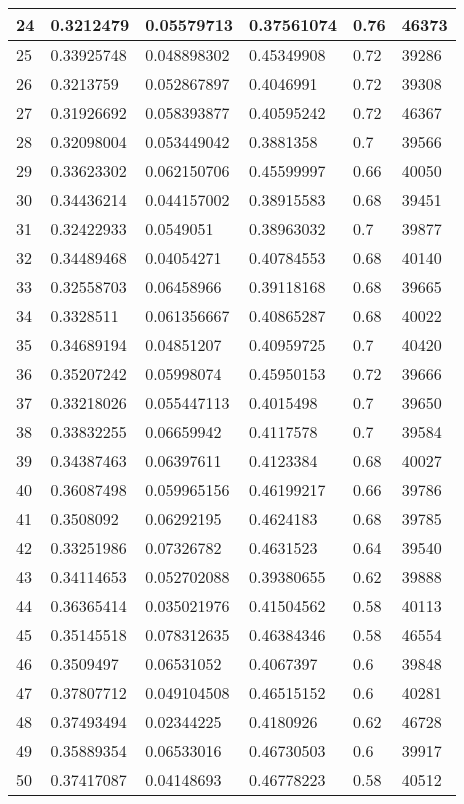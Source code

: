 \begin{longtable}{|l|l|l|l|l|l|}
24 & 0.3212479 & 0.05579713 & 0.37561074 & 0.76 & 46373 \\ \hline 
25 & 0.33925748 & 0.048898302 & 0.45349908 & 0.72 & 39286 \\ \hline 
26 & 0.3213759 & 0.052867897 & 0.4046991 & 0.72 & 39308 \\ \hline 
27 & 0.31926692 & 0.058393877 & 0.40595242 & 0.72 & 46367 \\ \hline 
28 & 0.32098004 & 0.053449042 & 0.3881358 & 0.7 & 39566 \\ \hline 
29 & 0.33623302 & 0.062150706 & 0.45599997 & 0.66 & 40050 \\ \hline 
30 & 0.34436214 & 0.044157002 & 0.38915583 & 0.68 & 39451 \\ \hline 
31 & 0.32422933 & 0.0549051 & 0.38963032 & 0.7 & 39877 \\ \hline 
32 & 0.34489468 & 0.04054271 & 0.40784553 & 0.68 & 40140 \\ \hline 
33 & 0.32558703 & 0.06458966 & 0.39118168 & 0.68 & 39665 \\ \hline 
34 & 0.3328511 & 0.061356667 & 0.40865287 & 0.68 & 40022 \\ \hline 
35 & 0.34689194 & 0.04851207 & 0.40959725 & 0.7 & 40420 \\ \hline 
36 & 0.35207242 & 0.05998074 & 0.45950153 & 0.72 & 39666 \\ \hline 
37 & 0.33218026 & 0.055447113 & 0.4015498 & 0.7 & 39650 \\ \hline 
38 & 0.33832255 & 0.06659942 & 0.4117578 & 0.7 & 39584 \\ \hline 
39 & 0.34387463 & 0.06397611 & 0.4123384 & 0.68 & 40027 \\ \hline 
40 & 0.36087498 & 0.059965156 & 0.46199217 & 0.66 & 39786 \\ \hline 
41 & 0.3508092 & 0.06292195 & 0.4624183 & 0.68 & 39785 \\ \hline 
42 & 0.33251986 & 0.07326782 & 0.4631523 & 0.64 & 39540 \\ \hline 
43 & 0.34114653 & 0.052702088 & 0.39380655 & 0.62 & 39888 \\ \hline 
44 & 0.36365414 & 0.035021976 & 0.41504562 & 0.58 & 40113 \\ \hline 
45 & 0.35145518 & 0.078312635 & 0.46384346 & 0.58 & 46554 \\ \hline 
46 & 0.3509497 & 0.06531052 & 0.4067397 & 0.6 & 39848 \\ \hline 
47 & 0.37807712 & 0.049104508 & 0.46515152 & 0.6 & 40281 \\ \hline 
48 & 0.37493494 & 0.02344225 & 0.4180926 & 0.62 & 46728 \\ \hline 
49 & 0.35889354 & 0.06533016 & 0.46730503 & 0.6 & 39917 \\ \hline 
50 & 0.37417087 & 0.04148693 & 0.46778223 & 0.58 & 40512 \\ \hline 
\end{longtable}